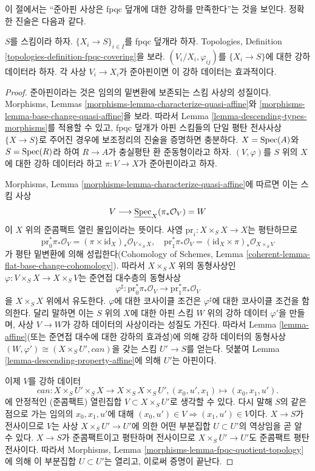 \noindent
이 절에서는 “준아핀 사상은 fpqc 덮개에 대한 강하를 만족한다”는 것을
보인다. 정확한 진술은 다음과 같다.

\begin{lemma}
\label{lemma-quasi-affine}
$S$를 스킴이라 하자. $\{X_i \to S\}_{i\in I}$를 fpqc 덮개라 하자.
Topologies, Definition \ref{topologies-definition-fpqc-covering}을 보라.
$(V_i/X_i, \varphi_{ij})$를 $\{X_i \to S\}$에 대한 강하 데이터라 하자.
각 사상 $V_i \to X_i$가 준아핀이면 이 강하 데이터는 효과적이다.
\end{lemma}

\begin{proof}
준아핀이라는 것은 임의의 밑변환에 보존되는 스킴 사상의 성질이다.
Morphisms, Lemmas \ref{morphisms-lemma-characterize-quasi-affine}와
\ref{morphisms-lemma-base-change-quasi-affine}을 보라. 따라서 Lemma
\ref{lemma-descending-types-morphisms}를 적용할 수 있고, fpqc 덮개가
아핀 스킴들의 단일 평탄 전사사상 $\{X \to S\}$로 주어진 경우에
보조정리의 진술을 증명하면 충분하다. $X = \mathop{\mathrm{Spec}}(A)$와 $S = \mathop{\mathrm{Spec}}(R)$라
하여 $R \to A$가 충실평탄 환 준동형이라고 하자. $(V, \varphi)$를
$S$ 위의 $X$에 대한 강하 데이터라 하고 $\pi : V \to X$가
준아핀이라고 하자.

\medskip\noindent
Morphisms, Lemma \ref{morphisms-lemma-characterize-quasi-affine}에 따르면
이는 스킴 사상
$$
V \longrightarrow \underline{\mathop{\mathrm{Spec}}}_X(\pi_*\mathcal{O}_V) = W
$$
이 $X$ 위의 준콤팩트 열린 몰입이라는 뜻이다. 사영
$\text{pr}_i : X \times_S X \to X$는 평탄하므로
$$
\text{pr}_0^*\pi_*\mathcal{O}_V =
(\pi \times \text{id}_X)_*\mathcal{O}_{V \times_S X}, \quad
\text{pr}_1^*\pi_*\mathcal{O}_V =
(\text{id}_X \times \pi)_*\mathcal{O}_{X \times_S V}
$$
가 평탄 밑변환에 의해 성립한다(Cohomology of Schemes, Lemma
\ref{coherent-lemma-flat-base-change-cohomology}). 따라서
$X \times_S X$ 위의 동형사상인
$\varphi : V \times_S X \to X \times_S V$는 준연접 대수층의 동형사상
$$
\varphi^\sharp :
\text{pr}_0^*\pi_*\mathcal{O}_V
\longrightarrow
\text{pr}_1^*\pi_*\mathcal{O}_V
$$
을 $X \times_S X$ 위에서 유도한다. $\varphi$에 대한 코사이클 조건은
$\varphi^\sharp$에 대한 코사이클 조건을 함의한다. 달리 말하면 이는
$S$ 위의 $X$에 대한 아핀 스킴 $W$ 위의 강하 데이터 $\varphi'$을
만들며, 사상 $V \to W$가 강하 데이터의 사상이라는 성질도 가진다.
따라서 Lemma \ref{lemma-affine}(또는 준연접 대수에 대한 강하의
효과성)에 의해 강하 데이터의 동형사상
$(W, \varphi') \cong (X \times_S U', can)$을 갖는 스킴 $U' \to S$를
얻는다. 덧붙여 Lemma \ref{lemma-descending-property-affine}에 의해
$U'$는 아핀이다.

\medskip\noindent
이제 $V$를 강하 데이터
$$
can : X \times_S U' \times_S X \to X \times_S X \times_S U',
(x_0, u', x_1) \mapsto (x_0, x_1, u').
$$
에 안정적인 (준콤팩트) 열린집합 $V \subset X \times_S U'$로 생각할 수
있다. 다시 말해 $S$의 같은 점으로 가는 임의의 $x_0, x_1, u'$에 대해
$(x_0, u') \in V \Rightarrow (x_1, u') \in V$이다. $X \to S$가
전사이므로 $V$는 사상 $X \times_S U' \to U'$에 의한 어떤 부분집합
$U \subset U'$의 역상임을 곧 알 수 있다. $X \to S$가 준콤팩트이고
평탄하며 전사이므로 $X \times_S U' \to U'$도 준콤팩트 평탄 전사이다.
따라서 Morphisms, Lemma \ref{morphisms-lemma-fpqc-quotient-topology}에
의해 이 부분집합 $U \subset U'$는 열리고, 이로써 증명이 끝난다.
\end{proof}

